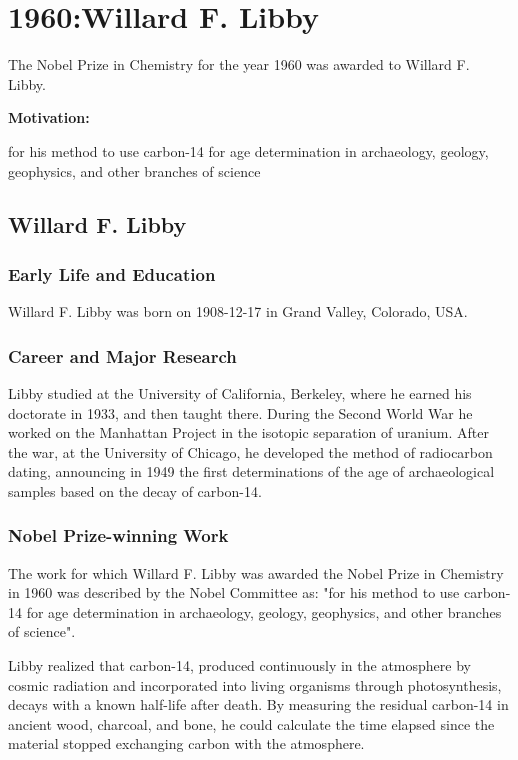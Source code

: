 \chapter{1960:Willard F. Libby}

\label{chap:chemistry1960}

The Nobel Prize in Chemistry for the year 1960 was awarded to Willard F. Libby.

\textbf{Motivation:}

for his method to use carbon-14 for age determination in archaeology, geology, geophysics, and other branches of science

\section{Willard F. Libby}

\subsection*{Early Life and Education}

Willard F. Libby was born on 1908-12-17 in Grand Valley, Colorado, USA.

\subsection*{Career and Major Research}

Libby studied at the University of California, Berkeley, where he earned his doctorate in 1933, and then taught there. During the Second World War he worked on the Manhattan Project in the isotopic separation of uranium. After the war, at the University of Chicago, he developed the method of radiocarbon dating, announcing in 1949 the first determinations of the age of archaeological samples based on the decay of carbon-14.

\subsection*{Nobel Prize-winning Work}

The work for which Willard F. Libby was awarded the Nobel Prize in Chemistry in 1960 was described by the Nobel Committee as: "for his method to use carbon-14 for age determination in archaeology, geology, geophysics, and other branches of science".

Libby realized that carbon-14, produced continuously in the atmosphere by cosmic radiation and incorporated into living organisms through photosynthesis, decays with a known half-life after death. By measuring the residual carbon-14 in ancient wood, charcoal, and bone, he could calculate the time elapsed since the material stopped exchanging carbon with the atmosphere.

